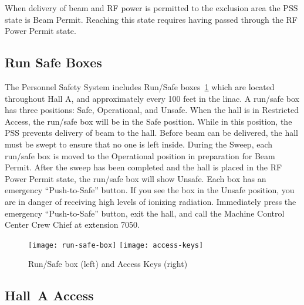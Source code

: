  When delivery of beam and RF power is permitted to the exclusion area
the PSS state is Beam Permit.  Reaching this state requires having
passed through the RF Power Permit state.

\begin{safetyen}{10}{10}
\subsection{ Run Safe Boxes}
\end{safetyen}

The Personnel Safety System includes Run/Safe 
boxes~\ref{fig:run-safe-box} which are located
throughout Hall A, and approximately every 100 feet in the linac. A
run/safe box has three positions: Safe, Operational, and Unsafe. When
the hall is in Restricted Access, the run/safe box will be in the Safe
position. While in this position, the PSS prevents delivery of beam to
the hall. Before beam can be delivered, the hall must be swept to
ensure that no one is left inside. During the Sweep, each run/safe box
is moved to the Operational position in preparation for Beam
Permit. After the sweep has been completed and the hall is placed in
the RF Power Permit state, the run/safe box will show Unsafe. Each box
has an emergency ``Push-to-Safe'' button. If you see the box in the Unsafe
position, you are in danger of receiving high levels of ionizing
radiation. Immediately press the emergency ``Push-to-Safe'' button, exit the hall,
and call the Machine Control Center Crew Chief at extension 7050.

\begin{figure}
\begin{center}
  \texttt{[image: run-safe-box]}\hspace{0.25in}
  \texttt{[image: access-keys]}
\end{center}
\caption[Introduction: Runs/Safe box, Access Keys]{Run/Safe box (left) 
  and Access Keys (right)}
\label{fig:run-safe-box}
\end{figure}

\begin{safetyen}{10}{10}
\section{Hall~A Access} 
\end{safetyen}

